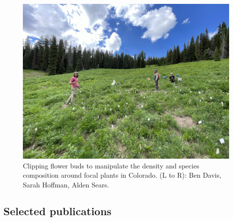 \documentclass[
  letterpaper,
  DIV=11,
  numbers=noendperiod]{scrartcl}
\begin{document}
\begin{figure}[H]

{\centering \includegraphics[width=6in,height=\textheight,keepaspectratio]{../static/clipping-experiment.jpg}

}

\caption{Clipping flower buds to manipulate the density and species
composition around focal plants in Colorado. (L to R): Ben Davis, Sarah
Hoffman, Alden Sears.}

\end{figure}%

\subsection{Selected publications}\label{selected-publications}
\end{document}

